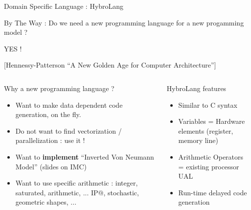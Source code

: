 \begin{Frame}{Domain Specific Language : HybroLang}
  \begin{alertblock}{By The Way : }
    Do we need a new programming language for a new progamming model ?

    YES ! 

    [Hennessy-Patterson ``A New Golden Age for Computer Architecture'']
  \end{alertblock}
 \begin{columns}[t]
  \begin{column}{\BW}
    \begin{block}{Why a new programming language ?}
      \begin{itemize}
      \item Want to make data dependent code generation, on the fly.
      \item Do not want to find vectorization / parallelization : use it !
      \item Want to \textbf{implement} ``Inverted Von Neumann Model''
        (slides on IMC)
      \item Want to use specific arithmetic : integer, saturated,
        arithmetic, ... IP@, stochastic, geometric shapes, ...
      \end{itemize}
    \end{block}
  \end{column}
  \begin{column}{\BW}
    \begin{block}{HybroLang features}
      \begin{itemize}
      \item Similar to C syntax
      \item Variables = Hardware elements (register, memory line)
      \item Arithmetic Operators = existing processor UAL
      \item Run-time delayed code generation 
      \end{itemize}
    \end{block}
  \end{column}
 \end{columns}
\end{Frame}
